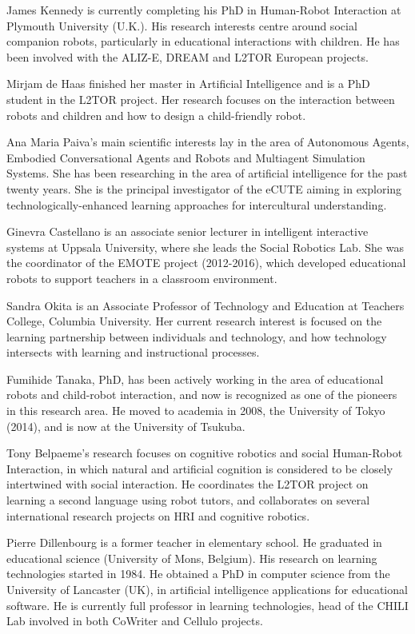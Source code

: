 \documentclass{sig-alternate-05-2015}
\begin{document}
James Kennedy is currently completing his PhD in Human-Robot Interaction at Plymouth University (U.K.). His research interests centre around social companion robots, particularly in educational interactions with children. He has been involved with the ALIZ-E, DREAM and L2TOR European projects.


Mirjam de Haas finished her master in Artificial Intelligence and is a PhD student in the L2TOR project. Her research focuses on the interaction between robots and children and how to design a child-friendly robot.

Ana Maria Paiva's main scientific interests lay in the area of Autonomous Agents, Embodied Conversational Agents and Robots and Multiagent Simulation Systems. She has been researching in the area of artificial intelligence for the past twenty years. She is the principal investigator of the eCUTE aiming in exploring technologically-enhanced learning approaches for intercultural understanding.

Ginevra Castellano is an associate senior lecturer in intelligent interactive systems at Uppsala University, where she leads the Social Robotics Lab. She was the coordinator of the EMOTE project (2012-2016), which developed educational robots to support teachers in a classroom environment.


Sandra Okita is an Associate Professor of Technology and Education at Teachers College, Columbia University. Her current research interest is focused on the learning partnership between individuals and technology, and how technology intersects with learning and instructional processes.

Fumihide Tanaka, PhD,  has been actively working in the area of educational robots and child-robot interaction, and now is recognized as one of the pioneers in this research area. He moved to academia in 2008, the University of Tokyo (2014), and is now at the University of Tsukuba.

Tony Belpaeme's research focuses on cognitive robotics and social Human-Robot Interaction, in which natural and artificial cognition is considered to be closely intertwined with social interaction. He coordinates the L2TOR project on learning a second language using robot tutors, and collaborates on several international research projects on HRI and cognitive robotics.

Pierre Dillenbourg is a former teacher in elementary school. He graduated in educational science (University of Mons, Belgium). His research on learning technologies started in 1984. He obtained a PhD in computer science from the University of Lancaster (UK), in artificial intelligence applications for educational software. He is currently full professor in learning technologies, head of the CHILI Lab involved in both CoWriter and Cellulo projects.
\end{document}
